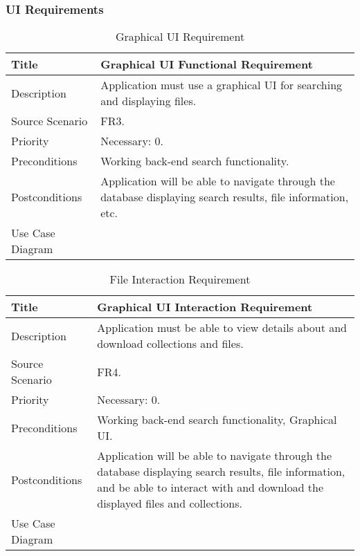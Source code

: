 \subsubsection{UI Requirements}
  \begin{table}[h!]
    \caption{Graphical UI Requirement}
    \label{system-requirements/functional-requirements/ui}
    \begin{tabularx}{\textwidth}{|l|X|}
      \hline
      Title            & Graphical UI Functional Requirement \\ \hline
      Description      & Application must use a graphical UI for searching and
                         displaying files. \\ \hline
      Source Scenario  & FR3. \\ \hline
      Priority         & Necessary: 0. \\ \hline
      Preconditions    & Working back-end search functionality. \\ \hline
      Postconditions   & Application will be able to navigate through the database
                         displaying search results, file information, etc. \\ \hline
      Use Case Diagram & \\ \hline
    \end{tabularx}
  \end{table}

  \begin{table}[h!]
    \caption{File Interaction Requirement}
    \label{system-requirements/functional-requirements/file-interaction}
    \begin{tabularx}{\textwidth}{|l|X|}
      \hline
      Title            & Graphical UI Interaction Requirement \\ \hline
      Description      & Application must be able to view details about and
                         download collections and files. \\ \hline
      Source Scenario  & FR4. \\ \hline
      Priority         & Necessary: 0. \\ \hline
      Preconditions    & Working back-end search functionality, Graphical UI.
                         \\ \hline
      Postconditions   & Application will be able to navigate through the
                         database displaying search results, file information,
                         and be able to interact with and download the displayed
                         files and collections. \\ \hline
      Use Case Diagram & \\ \hline
    \end{tabularx}
  \end{table}


